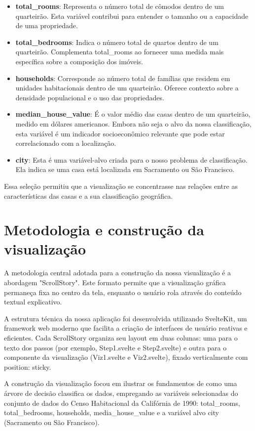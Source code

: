 \documentclass{article}
\begin{document}
\begin{itemize}
\item \textbf{total\_rooms}: Representa o número total de cômodos dentro de um quarteirão. 
Esta variável contribui para entender o tamanho ou a capacidade de uma propriedade.
\item \textbf{total\_bedrooms}: Indica o número total de quartos dentro de um quarteirão. 
Complementa total\_rooms ao fornecer uma medida mais específica sobre a composição dos imóveis.
\item \textbf{households}: Corresponde ao número total de famílias que residem em unidades habitacionais dentro de um quarteirão. 
Oferece contexto sobre a densidade populacional e o uso das propriedades.
\item \textbf{median\_house\_value}: É o valor médio das casas dentro de um quarteirão, medido em dólares americanos. 
Embora não seja o alvo da nossa classificação, esta variável é um indicador socioeconômico relevante 
que pode estar correlacionado com a localização.
\item \textbf{city}: Esta é uma variável-alvo criada para o nosso problema de classificação. Ela indica se uma casa está localizada 
em Sacramento ou São Francisco.
\end{itemize}

Essa seleção permitiu que a visualização se concentrasse nas relações entre as características das casas e a sua classificação geográfica.

\section{Metodologia e construção da visualização}

A metodologia central adotada para a construção da nossa visualização é a abordagem "ScrollStory". Este 
formato permite que a visualização gráfica permaneça fixa no centro da tela, enquanto o usuário rola através 
do conteúdo textual explicativo.

A estrutura técnica da nossa aplicação foi desenvolvida utilizando SvelteKit, um framework web moderno 
que facilita a criação de interfaces de usuário reativas e eficientes. Cada ScrollStory organiza seu 
layout em duas colunas: uma para o texto dos passos (por exemplo, Step1.svelte e Step2.svelte) e outra 
para o componente da visualização (Viz1.svelte e Viz2.svelte), fixado verticalmente com position: sticky. 

A construção da visualização focou em ilustrar os fundamentos de como uma árvore de decisão classifica os 
dados, empregando as variáveis selecionadas do conjunto de dados do Censo Habitacional da Califórnia de 1990: 
total\_rooms, total\_bedrooms, households, media\_house\_value e a variável alvo city (Sacramento ou São Francisco). 
 
\end{document}
